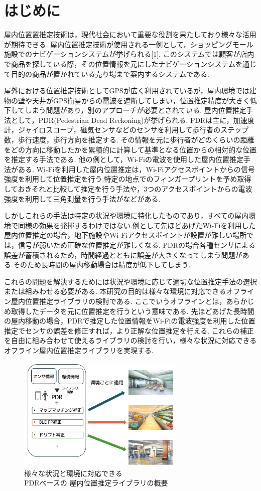 
\section{はじめに}
屋内位置置推定技術は，現代社会において重要な役割を果たしており様々な活用が期待できる.
屋内位置推定技術が使用される一例として，ショッピングモール施設でのナビゲーションシステムが挙げられる[1].
このシステムでは顧客が店内で商品を探している際，その位置情報を元にしたナビゲーションシステムを通じて目的の商品が置かれている売り場まで案内するシステムである.

屋外における位置推定技術としてGPSが広く利用されているが，屋内環境では建物の壁や天井がGPS衛星からの電波を遮断してしまい，位置推定精度が大きく低下してしまう問題があり，別のアプローチが必要とされている.
屋内位置推定手法として，PDR(Pedestrian Dead Reckoning)が挙げられる.
PDRは主に，加速度計，ジャイロスコープ，磁気センサなどのセンサを利用して歩行者のステップ数，歩行速度，歩行方向を推定する.
その情報を元に歩行者がどのくらいの距離をどの方向に移動したかを累積的に計算して基準となる位置からの相対的な位置を推定する手法である.
他の例として，Wi-Fiの電波を使用した屋内位置推定手法がある.
Wi-Fiを利用した屋内位置推定は，Wi-Fiアクセスポイントからの信号強度を利用して位置推定を行う.特定の地点でのフィンガープリントを予め取得しておきそれと比較して推定を行う手法や，3つのアクセスポイントからの電波強度を利用して三角測量を行う手法がなどがある.

しかしこれらの手法は特定の状況や環境に特化したものであり，すべての屋内環境で同様の効果を発揮するわけではない.例として先ほどあげたWi-Fiを利用した屋内位置推定の場合，地下施設やWi-Fiアクセスポイントが設置が難しい場所では，信号が弱いため正確な位置推定が難しくなる.
PDRの場合各種センサによる誤差が蓄積されるため，時間経過とともに誤差が大きくなってしまう問題がある.そのため長時間の屋内移動場合は精度が低下してしまう.

これらの問題を解決するためには状況や環境に応じて適切な位置推定手法の選択または組みわせる必要がある.
本研究の目的は様々な環境に対応できるオフライン屋内位置推定ライブラリの検討である.
ここでいうオフラインとは，あらかじめ取得したデータを元に位置推定を行うという意味である.
先ほどあげた長時間の屋内移動の場合，PDRで推定した位置情報をWi-Fiの電波強度を利用した位置推定でセンサの誤差を修正すれば，より正解な位置推定を行える.
これらの補正を自由に組み合わせて使えるライブラリの検討を行い，様々な状況に対応できるオフライン屋内位置推定ライブラリを実現する.

\begin{figure}[h]
	\centering
	\includegraphics[width=80mm]{image/first.png}
	\caption{様々な状況と環境に対応できる\\PDRベースの
		屋内位置推定ライブラリの概要}    \label{fig:overview}
\end{figure}
